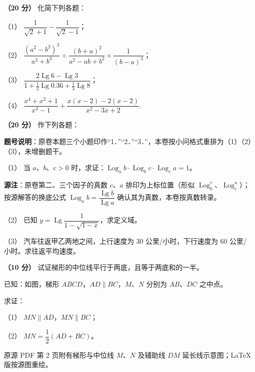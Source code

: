 \begin{question}
\textbf{（20 分）} 化简下列各题：

（1） $\dfrac{1}{\sqrt2+1}-\dfrac{1}{\sqrt2-1}$；

（2） $\dfrac{(a^2-b^2)^3}{a^3+b^3}\div\dfrac{(b+a)^2}{a^2-ab+b^2}\times\dfrac{1}{(b-a)^3}$；

（3） $\dfrac{2\operatorname{Lg}6-\operatorname{Lg}3}{1+\frac12\operatorname{Lg}0.36+\frac13\operatorname{Lg}8}$；

（4） $\dfrac{x^4+x^2+1}{x^3-1}+\dfrac{x(x-2)-2(x-2)}{x^2-3x+2}$.

\end{question}
\begin{question}
\textbf{（20 分）} 作下列各题：

\begin{gktip}
\textbf{题号说明}：原卷本题三个小题印作“1．”“2．”“3．”，本卷按小问格式重排为（1）（2）（3），未增删题干。
\end{gktip}

（1） 当 $a\text{、}b\text{、}c>0$ 时，求证：$\operatorname{Log}_a b\cdot\operatorname{Log}_b c\cdot\operatorname{Log}_c a=1$。

\begin{gktip}
\textbf{源注}：原卷第二、三个因子的真数 $c\text{、}a$ 排印为上标位置（形似 $\operatorname{Log}_b^c$、$\operatorname{Log}_c^a$）；按源解答的换底公式 $\operatorname{Log}_a b=\dfrac{\operatorname{Lg}b}{\operatorname{Lg}a}$ 确认其为真数，本卷按真数转录。
\end{gktip}

（2） 已知 $y=\operatorname{Lg}\dfrac{1}{1-\sqrt{1-x}}$，求定义域。

（3） 汽车往返甲乙两地之间，上行速度为 30 公里/小时，下行速度为 60 公里/小时。求往返平均速度。

\Needspace{0.4\textheight}
\end{question}
\begin{question}
\textbf{（10 分）} 试证梯形的中位线平行于两底，且等于两底和的一半。

已知：如图，梯形 $ABCD$，$AD\parallel BC$，$M\text{、}N$ 分别为 $AB\text{、}DC$ 之中点。

求证：

（1） $MN\parallel AD$，$MN\parallel BC$；

（2） $MN=\dfrac12(AD+BC)$。

\begin{gktip}
原源 PDF 第 2 页附有梯形与中位线 $M\text{、}N$ 及辅助线 $DM$ 延长线示意图；LaTeX 版按源图重绘。
\end{gktip}
\nopagebreak[4]
\begin{center}\end{center}
\nopagebreak[4]
\end{question}
